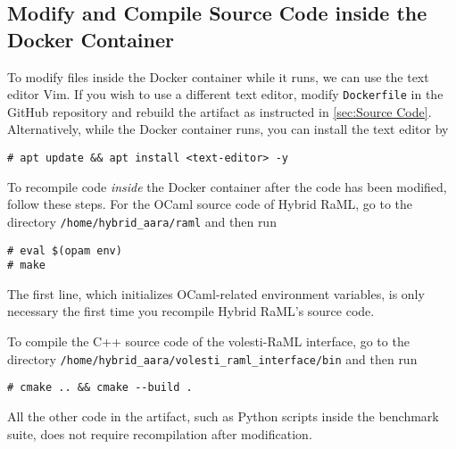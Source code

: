 \subsection{Modify and Compile Source Code inside the Docker Container}

To modify files inside the Docker container while it runs, we can use the text
editor Vim.
%
If you wish to use a different text editor, modify \texttt{Dockerfile} in the
GitHub repository and rebuild the artifact as instructed in \cref{sec:Source
Code}.
%
Alternatively, while the Docker container runs, you can install the text
editor by
\begin{verbatim}
# apt update && apt install <text-editor> -y
\end{verbatim}

To recompile code \emph{inside} the Docker container after the code has been
modified, follow these steps.
%
For the OCaml source code of Hybrid RaML, go to the directory
\texttt{/home/hybrid\_aara/raml} and then run
\begin{verbatim}
# eval $(opam env)
# make
\end{verbatim}
%
The first line, which initializes OCaml-related environment variables, is only
necessary the first time you recompile Hybrid RaML's source code.

To compile the C++ source code of the volesti-RaML interface, go to the
directory \texttt{/home/hybrid\_aara/volesti\_raml\_interface/bin} and then run
\begin{verbatim}
# cmake .. && cmake --build .
\end{verbatim}

All the other code in the artifact, such as Python scripts inside the benchmark
suite, does not require recompilation after modification.
